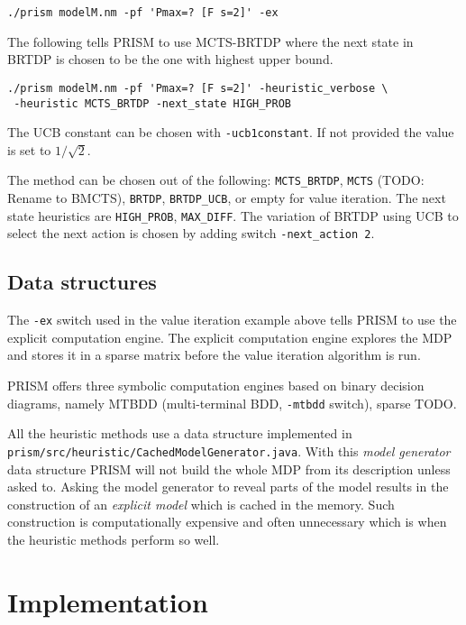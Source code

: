 \medskip
\begin{verbatim}
./prism modelM.nm -pf 'Pmax=? [F s=2]' -ex
\end{verbatim}
\medskip

The following tells PRISM to use MCTS-BRTDP where the next state in
BRTDP is chosen to be the one with highest upper bound.

\medskip
\begin{verbatim}
./prism modelM.nm -pf 'Pmax=? [F s=2]' -heuristic_verbose \
 -heuristic MCTS_BRTDP -next_state HIGH_PROB
\end{verbatim}
\medskip

The UCB constant can be chosen with
\verb|-ucb1constant|. If not provided the value is set to
$1/\sqrt{2}$.

The method can be chosen out of the following: \verb|MCTS_BRTDP|,
\verb|MCTS| (TODO: Rename to BMCTS), \verb|BRTDP|, \verb|BRTDP_UCB|,
or empty for value  iteration.
The next state heuristics are
\verb|HIGH_PROB|, \verb|MAX_DIFF|.
The variation of BRTDP using UCB to select the next action is chosen by
adding switch \verb|-next_action 2|.

\subsection*{Data structures}
The \verb|-ex| switch used in the value iteration example above tells
PRISM to use the explicit computation engine.
The explicit computation engine explores the MDP and stores it in
a sparse matrix before the value iteration algorithm is run.

PRISM offers three symbolic computation engines based on binary decision
diagrams, namely MTBDD (multi-terminal BDD, \verb|-mtbdd| switch),
sparse TODO.

All the heuristic methods use a data structure implemented in
\verb|prism/src/heuristic/CachedModelGenerator.java|.
With this {\em model generator} data structure PRISM will not build the
whole MDP from its description unless asked to.
Asking the model generator to reveal parts of the model results in the
construction of an {\em explicit model} which is cached in the memory.
Such construction is computationally expensive and often unnecessary
which is when the heuristic methods perform so well.

\section{Implementation}

